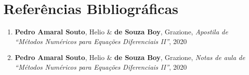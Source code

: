 \chapter{Referências Bibliográficas}

\begin{enumerate}
    \item \textbf{Pedro Amaral Souto}, Helio \& \textbf{de Souza Boy},
    Grazione, \textit{Apostila de ``Métodos Numéricos para Equações
    Diferenciais II''}, 2020
    \item \textbf{Pedro Amaral Souto}, Helio \& \textbf{de Souza Boy},
    Grazione, \textit{Notas de aula de ``Métodos Numéricos para Equações
    Diferenciais II''}, 2020
\end{enumerate}